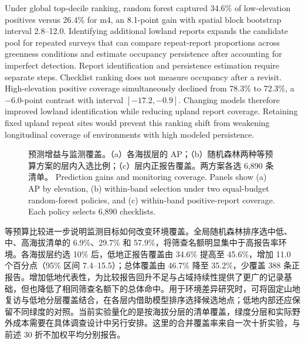 \else
Under global top-decile ranking, random forest captured 34.6\% of low-elevation positives versus 26.4\% for m4, an 8.1-point gain with spatial block bootstrap interval 2.8--12.0. Identifying additional lowland reports expands the candidate pool for repeated surveys that can compare repeat-report proportions across greenness conditions and estimate occupancy persistence after accounting for imperfect detection. Report identification and persistence estimation require separate steps. Checklist ranking does not measure occupancy after a revisit. High-elevation positive coverage simultaneously declined from 78.3\% to 72.3\%, a $-6.0$-point contrast with interval $[-17.2,-0.9]$. Changing models therefore improved lowland identification while reducing upland report coverage. Retaining fixed upland repeat sites would prevent this ranking shift from weakening longitudinal coverage of environments with high modeled persistence.
\fi
\begin{figure}[htbp]\centering
{}
\caption{\ifzh
预测增益与监测覆盖。（a）各海拔层的 AP；（b）随机森林两种等预算方案的层内入选比例；（c）层内正报告覆盖。两方案各选 6,890 条清单。
\else
Prediction gains and monitoring coverage. Panels show (a) AP by elevation, (b) within-band selection under two equal-budget random-forest policies, and (c) within-band positive-report coverage. Each policy selects 6,890 checklists.
\fi}\label{fig:envmonitor}
\end{figure}
\par
\ifzh
等预算比较进一步说明监测目标如何改变环境覆盖。全局随机森林排序选中低、中、高海拔清单的 6.9\%、29.7\% 和 57.9\%，将筛查名额明显集中于高报告率环境。各海拔层约选 10\% 后，低地正报告覆盖由 34.6\% 提高至 45.6\%，增加 11.0 个百分点（95\% 区间 7.4--15.5）；总体覆盖由 46.7\% 降至 35.2\%，少覆盖 388 条正报告。增加低地代表性，为比较报告回升不足与占域持续性提供了更广的记录基础，但也降低了相同筛查名额下的总体命中。用于环境差异研究时，可将固定山地复访与低地分层覆盖结合，在各层内借助模型排序选择候选地点；低地内部还应保留不同绿度的对照。当前实验量化的是按海拔分层的清单覆盖，绿度分层和实际野外成本需要在具体调查设计中另行安排。这里的合并覆盖率来自一次十折实验，与前述 30 折不加权平均分别报告。
\else
